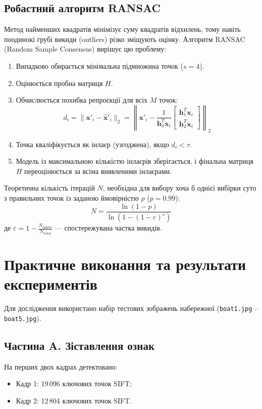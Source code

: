 \documentclass[14pt, a4paper]{article}
\begin{document}
\subsection{Робастний алгоритм RANSAC}
Метод найменших квадратів мінімізує суму квадратів відхилень, тому навіть поодинокі грубі викиди (outliers) різко зміщують оцінку. Алгоритм RANSAC (Random Sample Consensus) вирішує цю проблему:
\begin{enumerate}
    \item Випадково обирається мінімальна підмножина точок ($s = 4$).
    \item Оцінюється пробна матриця $H$.
    \item Обчислюється похибка репроєкції для всіх $M$ точок:
    \begin{equation}
        d_i = \|\mathbf{x}'_i - \hat{\mathbf{x}}'_i\|_2 = \left\| \mathbf{x}'_i - \frac{1}{\mathbf{h}_3^T \mathbf{x}_i} \begin{bmatrix} \mathbf{h}_1^T \mathbf{x}_i \\ \mathbf{h}_2^T \mathbf{x}_i \end{bmatrix} \right\|_2
    \end{equation}
    \item Точка кваліфікується як інлаєр (узгоджена), якщо $d_i < \tau$.
    \item Модель із максимальною кількістю інлаєрів зберігається, і фінальна матриця $H$ переоцінюється за всіма виявленими інлаєрами.
\end{enumerate}

Теоретична кількість ітерацій $N$, необхідна для вибору хоча б однієї вибірки суто з правильних точок із заданою ймовірністю $p$ ($p=0.99$):
\begin{equation}
    N = \frac{\ln(1 - p)}{\ln(1 - (1 - \varepsilon)^s)}
\end{equation}
де $\varepsilon = 1 - \frac{N_{\text{inliers}}}{N_{\text{total}}}$ --- спостережувана частка викидів.

\section{Практичне виконання та результати експериментів}

Для дослідження використано набір тестових зображень набережної (\texttt{boat1.jpg} -- \texttt{boat5.jpg}).

\subsection{Частина A. Зіставлення ознак}
На перших двох кадрах детектовано:
\begin{itemize}
    \item Кадр 1: 19\,096 ключових точок SIFT;
    \item Кадр 2: 12\,804 ключових точок SIFT.
\end{itemize}
\end{document}
